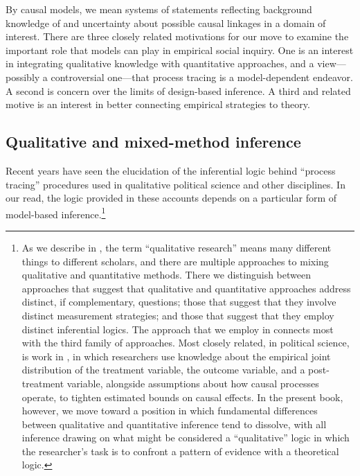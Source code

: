 \documentclass[12pt,]{book}
\let\rmarkdownfootnote\footnote%
\def\footnote{\protect\rmarkdownfootnote}
\begin{document}
By causal models, we mean systems of statements reflecting background knowledge of and uncertainty about possible causal linkages in a domain of interest. There are three closely related motivations for our move to examine the important role that models can play in empirical social inquiry. One is an interest in integrating qualitative knowledge with quantitative approaches, and a view---possibly a controversial one---that process tracing is a model-dependent endeavor. A second is concern over the limits of design-based inference. A third and related motive is an interest in better connecting empirical strategies to theory.

\hypertarget{qualitative-and-mixed-method-inference}{%
\subsection{Qualitative and mixed-method inference}\label{qualitative-and-mixed-method-inference}}

Recent years have seen the elucidation of the inferential logic behind ``process tracing'' procedures used in qualitative political science and other disciplines. In our read, the logic provided in these accounts depends on a particular form of model-based inference.\footnote{As we describe in \citet{humphreys2015mixing}, the term ``qualitative research'' means many different things to different scholars, and there are multiple approaches to mixing qualitative and quantitative methods. There we distinguish between approaches that suggest that qualitative and quantitative approaches address distinct, if complementary, questions; those that suggest that they involve distinct measurement strategies; and those that suggest that they employ distinct inferential logics. The approach that we employ in \citet{humphreys2015mixing} connects most with the third family of approaches. Most closely related, in political science, is work in \citet{GlynnQuinn2011}, in which researchers use knowledge about the empirical joint distribution of the treatment variable, the outcome variable, and a post-treatment variable, alongside assumptions about how causal processes operate, to tighten estimated bounds on causal effects. In the present book, however, we move toward a position in which fundamental differences between qualitative and quantitative inference tend to dissolve, with all inference drawing on what might be considered a ``qualitative'' logic in which the researcher's task is to confront a pattern of evidence with a theoretical logic.}
\end{document}
